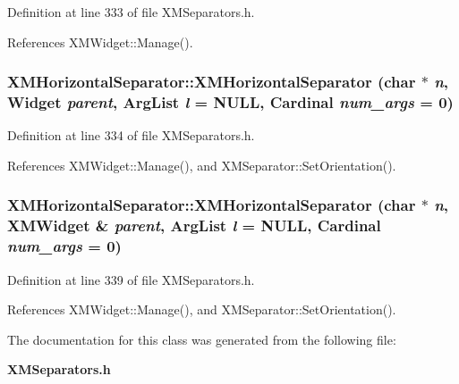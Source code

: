 Definition at line 333 of file XMSeparators.h.

References XMWidget::Manage().
\subsubsection{\setlength{\rightskip}{0pt plus 5cm}XMHorizontal\-Separator::XMHorizontal\-Separator (char $\ast$ {\em n}, Widget {\em parent}, Arg\-List {\em l} = NULL, Cardinal {\em num\_\-args} = 0)\hspace{0.3cm}{\tt  [inline]}}\label{classXMHorizontalSeparator_a1}




Definition at line 334 of file XMSeparators.h.

References XMWidget::Manage(), and XMSeparator::Set\-Orientation().
\subsubsection{\setlength{\rightskip}{0pt plus 5cm}XMHorizontal\-Separator::XMHorizontal\-Separator (char $\ast$ {\em n}, {\bf XMWidget} \& {\em parent}, Arg\-List {\em l} = NULL, Cardinal {\em num\_\-args} = 0)\hspace{0.3cm}{\tt  [inline]}}\label{classXMHorizontalSeparator_a2}




Definition at line 339 of file XMSeparators.h.

References XMWidget::Manage(), and XMSeparator::Set\-Orientation().

The documentation for this class was generated from the following file:\begin{CompactItemize}
\item 
{\bf XMSeparators.h}\end{CompactItemize}
